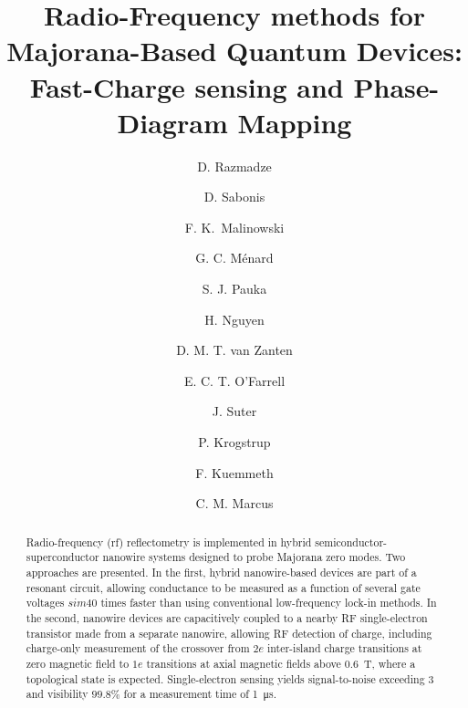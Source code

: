 \makeatletter\frontmatter@init\makeatother

\title{Radio-Frequency methods for Majorana-Based Quantum Devices: \\ Fast-Charge sensing and Phase-Diagram Mapping}

\author{D. Razmadze}
\author{D. Sabonis}
\author{F. K.~Malinowski}
\author{G. C. M\'enard}
\author{S. J. Pauka}
\author{H. Nguyen}
\author{D. M. T. van Zanten}
\author{E. C. T. O'Farrell}
\author{J. Suter}
\author{P. Krogstrup}
\author{F. Kuemmeth}
\author{C. M. Marcus}

\makeatletter
\begingroup
\@author@finish
\frontmatter@author@produce@script
\endgroup
\makeatother

\begin{abstract}
Radio-frequency (rf) reflectometry is implemented in hybrid semiconductor-superconductor nanowire systems designed to probe Majorana zero modes. Two approaches are presented. In the first, hybrid nanowire-based devices are part of a resonant circuit, allowing conductance to be measured as a function of several gate voltages $sim 40$ times faster than using conventional low-frequency lock-in methods. In the second, nanowire devices are capacitively coupled to a nearby RF single-electron transistor made from a separate nanowire, allowing RF detection of charge, including charge-only measurement of the crossover from $2e$ inter-island charge transitions at zero magnetic field to $1e$ transitions at axial magnetic fields above \SI{0.6}{\tesla}, where a topological state is expected. Single-electron sensing yields signal-to-noise exceeding 3 and visibility $99.8\%$ for a measurement time of \SI{1}{\micro\second}.
\end{abstract}

